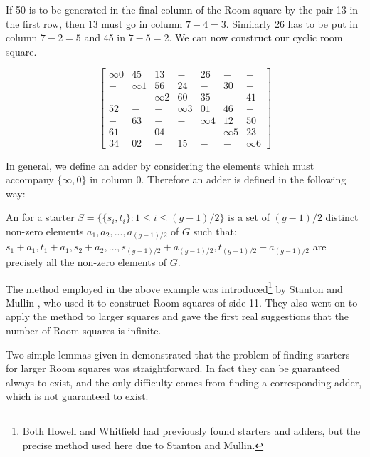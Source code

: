 If 50 is to be generated in the final column of the Room square by the pair 13 in the first row, then 13 must go in column $7 - 4 = 3$.
Similarly 26 has to be put in column $7 - 2 = 5$ and 45 in $7 - 5 = 2$.
We can now construct our cyclic room square.

\begin{equation}
  \begin{bmatrix}
    \infty 0 &  45 &  13 &   - &  26 &   - &   - \\
     - &  \infty 1 &  56 &  24 &   - &  30 &   - \\
     - &   - &  \infty 2 &  60 &  35 &   - &  41 \\
    52 &   - &   - &  \infty 3 &  01 &  46 &   - \\
     - &  63 &   - &   - &  \infty 4 &  12 &  50 \\
    61 &   - &  04 &   - &   - &  \infty 5 &  23 \\
    34 &  02 &   - &  15 &   - &   - &  \infty 6 
  \end{bmatrix}
  \label{eq:cyclic-room}
\end{equation}

In general, we define an adder by considering the elements which must accompany $\{\infty, 0\}$ in column 0.
Therefore an adder is defined in the following way:

An  for a starter
$S = \{\{s_i, t_i\}: 1 \leq i \leq (g - 1)/2 \}$
is a set of $(g - 1)/2$ distinct non-zero elements
$a_1, a_2, ..., a_{(g - 1)/2}$ of $G$ such that:
$s_1 + a_1, t_1 + a_1, s_2 + a_2, \ldots, s_{(g - 1)/2} + a_{(g - 1)/2}, t_{(g - 1)/2} + a_{(g - 1)/2}$
are precisely all the non-zero elements of $G$.

The  method employed in the above example was introduced\footnote{Both Howell and Whitfield had previously found starters and adders, but the precise method used here due to Stanton and Mullin.}
by Stanton and Mullin
\cite{stantonConstructionRoomSquares1968},
who used it to construct Room squares of side 11.
They also went on to apply the method to larger squares and gave the first real suggestions that the number of Room squares is infinite.

Two simple lemmas given in
\cite{stantonConstructionRoomSquares1968}
demonstrated that the problem of finding starters for larger Room squares was straightforward.
In fact they can be guaranteed always to exist, and the only difficulty comes from finding a corresponding adder, which is not guaranteed to exist.

